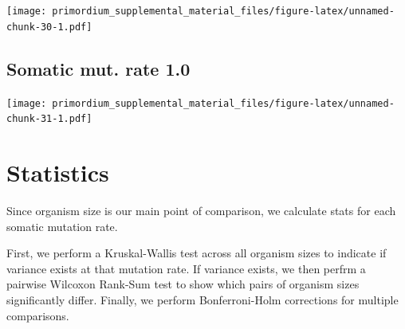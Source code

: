 \documentclass[]{book}
\begin{document}
\texttt{[image: primordium\_supplemental\_material\_files/figure-latex/unnamed-chunk-30-1.pdf]}

\hypertarget{somatic-mut.-rate-1.0}{%
\subsection{Somatic mut. rate 1.0}\label{somatic-mut.-rate-1.0}}

\texttt{[image: primordium\_supplemental\_material\_files/figure-latex/unnamed-chunk-31-1.pdf]}

\hypertarget{statistics-1}{%
\section{Statistics}\label{statistics-1}}

Since organism size is our main point of comparison, we calculate stats for each somatic mutation rate.

First, we perform a Kruskal-Wallis test across all organism sizes to indicate if variance exists at that mutation rate.
If variance exists, we then perfrm a pairwise Wilcoxon Rank-Sum test to show which pairs of organism sizes significantly differ.
Finally, we perform Bonferroni-Holm corrections for multiple comparisons.
\end{document}
